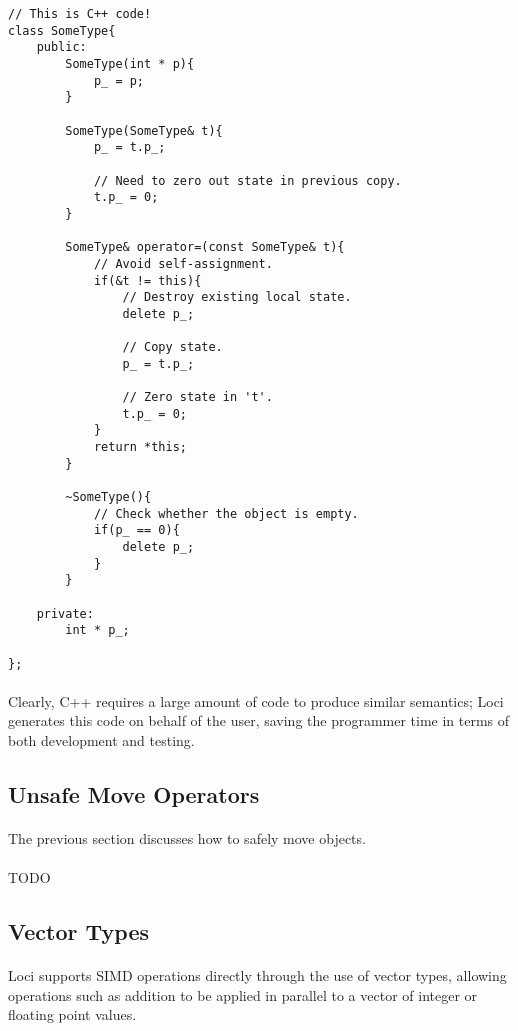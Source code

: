 \documentclass[12pt,twoside,notitlepage]{report}
\begin{document}
\begin{lstlisting}
// This is C++ code!
class SomeType{
	public:
		SomeType(int * p){
			p_ = p;
		}
		
		SomeType(SomeType& t){
			p_ = t.p_;
			
			// Need to zero out state in previous copy.
			t.p_ = 0;
		}
		
		SomeType& operator=(const SomeType& t){
			// Avoid self-assignment.
			if(&t != this){
				// Destroy existing local state.
				delete p_;
				
				// Copy state.
				p_ = t.p_;
				
				// Zero state in 't'.
				t.p_ = 0;
			}
			return *this;
		}
		
		~SomeType(){
			// Check whether the object is empty.
			if(p_ == 0){
				delete p_;
			}
		}
	
	private:
		int * p_;
	
};
\end{lstlisting}


\paragraph{}
Clearly, C++ requires a large amount of code to produce similar semantics; Loci generates this code on behalf of the user, saving the programmer time in terms of both development and testing.

\clearpage

\subsection{Unsafe Move Operators}

\paragraph{}
The previous section discusses how to safely move objects.

\paragraph{}
TODO

\clearpage

\subsection{Vector Types}

\paragraph{}
Loci supports SIMD operations directly through the use of vector types, allowing operations such as addition to be applied in parallel to a vector of integer or floating point values.
\end{document}

